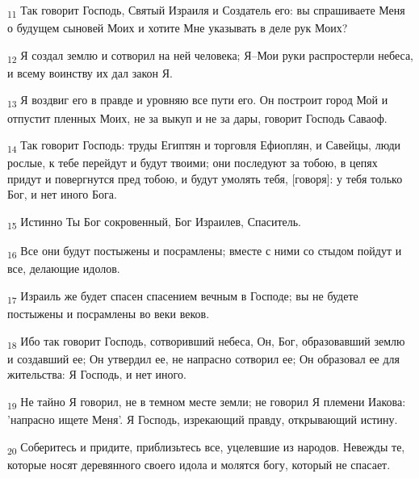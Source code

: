 \begin{tcolorbox}
\textsubscript{11} Так говорит Господь, Святый Израиля и Создатель его: вы спрашиваете Меня о будущем сыновей Моих и хотите Мне указывать в деле рук Моих?
\end{tcolorbox}
\begin{tcolorbox}
\textsubscript{12} Я создал землю и сотворил на ней человека; Я--Мои руки распростерли небеса, и всему воинству их дал закон Я.
\end{tcolorbox}
\begin{tcolorbox}
\textsubscript{13} Я воздвиг его в правде и уровняю все пути его. Он построит город Мой и отпустит пленных Моих, не за выкуп и не за дары, говорит Господь Саваоф.
\end{tcolorbox}
\begin{tcolorbox}
\textsubscript{14} Так говорит Господь: труды Египтян и торговля Ефиоплян, и Савейцы, люди рослые, к тебе перейдут и будут твоими; они последуют за тобою, в цепях придут и повергнутся пред тобою, и будут умолять тебя, [говоря]: у тебя только Бог, и нет иного Бога.
\end{tcolorbox}
\begin{tcolorbox}
\textsubscript{15} Истинно Ты Бог сокровенный, Бог Израилев, Спаситель.
\end{tcolorbox}
\begin{tcolorbox}
\textsubscript{16} Все они будут постыжены и посрамлены; вместе с ними со стыдом пойдут и все, делающие идолов.
\end{tcolorbox}
\begin{tcolorbox}
\textsubscript{17} Израиль же будет спасен спасением вечным в Господе; вы не будете постыжены и посрамлены во веки веков.
\end{tcolorbox}
\begin{tcolorbox}
\textsubscript{18} Ибо так говорит Господь, сотворивший небеса, Он, Бог, образовавший землю и создавший ее; Он утвердил ее, не напрасно сотворил ее; Он образовал ее для жительства: Я Господь, и нет иного.
\end{tcolorbox}
\begin{tcolorbox}
\textsubscript{19} Не тайно Я говорил, не в темном месте земли; не говорил Я племени Иакова: 'напрасно ищете Меня'. Я Господь, изрекающий правду, открывающий истину.
\end{tcolorbox}
\begin{tcolorbox}
\textsubscript{20} Соберитесь и придите, приблизьтесь все, уцелевшие из народов. Невежды те, которые носят деревянного своего идола и молятся богу, который не спасает.
\end{tcolorbox}
